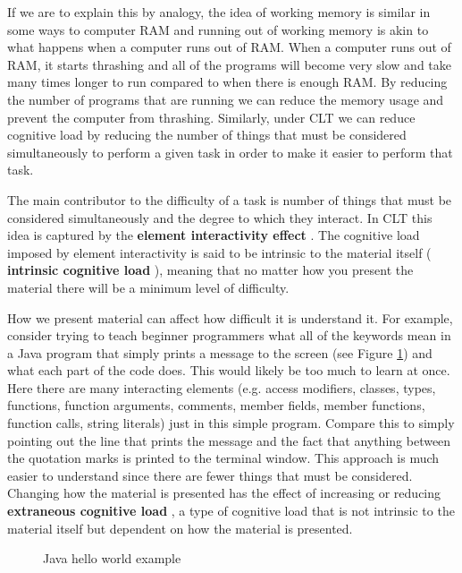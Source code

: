 \documentclass[12pt]{article}
\theoremstyle{grammarstyle}
\newcommand{\keyword}[1]{%
    \textbf{#1}%
}
\begin{document}
If we are to explain this by analogy, the idea of working memory is similar in some ways to computer RAM and running out of working memory is akin to what happens when a computer runs out of RAM. When a computer runs out of RAM, it starts thrashing and all of the programs will become very slow and take many times longer to run compared to when there is enough RAM. By reducing the number of programs that are running we can reduce the memory usage and prevent the computer from thrashing. Similarly, under CLT we can reduce cognitive load by reducing the number of things that must be considered simultaneously to perform a given task in order to make it easier to perform that task. 

The main contributor to the difficulty of a task is number of things that must be considered simultaneously and the degree to which they interact. In CLT this idea is captured by the \keyword{element interactivity effect} \citep{sweller2011element}. The cognitive load imposed by element interactivity is said to be intrinsic to the material itself (\keyword{intrinsic cognitive load}), meaning that no matter how you present the material there will be a minimum level of difficulty.

How we present material can affect how difficult it is understand it. For example, consider trying to teach beginner programmers what all of the keywords mean in a Java program that simply prints a message to the screen (see Figure \ref{fig:java_hello_world}) and what each part of the code does. This would likely be too much to learn at once. Here there are many interacting elements (e.g. access modifiers, classes, types, functions, function arguments, comments, member fields, member functions, function calls, string literals) just in this simple program. Compare this to simply pointing out the line that prints the message and the fact that anything between the quotation marks is printed to the terminal window. This approach is much easier to understand since there are fewer things that must be considered. Changing how the material is presented has the effect of increasing or reducing \keyword{extraneous cognitive load}, a type of cognitive load that is not intrinsic to the material itself but dependent on how the material is presented. 

\begin{figure}
    \centering
     \lstset{xleftmargin=20pt}
    
    \caption{Java hello world example}
    \label{fig:java_hello_world}
\end{figure}
\end{document}
